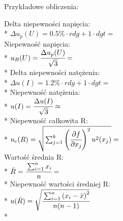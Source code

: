 \documentclass{article}
\begin{document}
\begin{center}
    \begin{flushleft}
        Przykładowe obliczenia:\\
    \end{flushleft}
    Delta niepewności napięcia:\\*
    $\Delta u_p (U)  = 0.5\% \cdot rdg+1 \cdot dgt=$\\
    \vspace{5mm}
    Niepewność napięcia:\\*
    $u_B (U)=\cfrac{\Delta u_p(U)}{\sqrt{3}}=$\\*
    \vspace{5mm}
    Delta niepewności natężenia:\\* 
    $\Delta u(I) = 1.2\% \cdot rdg+1 \cdot dgt =$\\*
    \vspace{5mm}
    Niepewność natężenia:\\*
    $u(I)= \cfrac{\Delta u(I)}{\sqrt{3}} \approx $\\*
    \vspace{5mm}
    Niepewność całkowita R:\\*
    $u_c (R)=\sqrt{\sum_{j=1}^{k}\left( \cfrac{\partial f}{\partial x_j}\right)^2 u^2 (x_j)}
    =$\\%
    \vspace{5mm}
    Wartość średnia R:\\* 
    $\bar{R} = \cfrac{\sum_{i=1}^{n}x_i}{n}=$\\*
    \vspace{5mm}
    Niepewność wartości średniej R:\\*
    $u(\bar{R}) = \sqrt{\cfrac{\sum_{i=1}^{n} \left(x_i - \bar{x} \right)^2}{n(n-1)}} $\\*



\end{center}
\newpage
\end{document}

